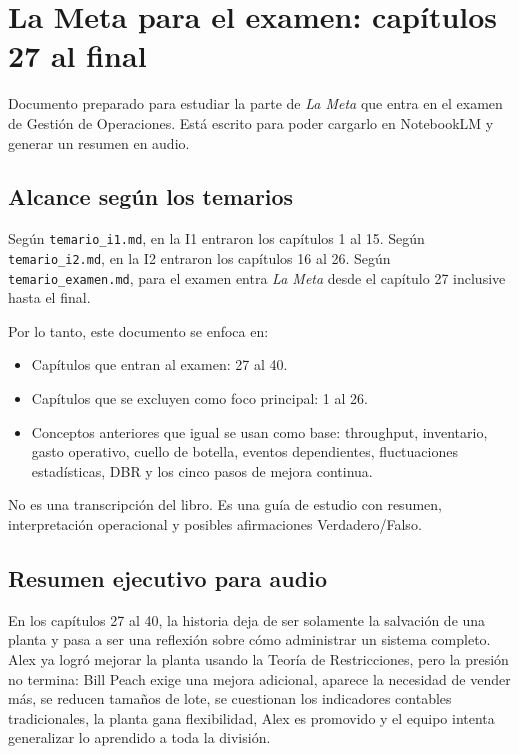 \documentclass[
  11pt,
]{article}
\author{}
\date{}
\providecommand{\tightlist}{%
  \setlength{\itemsep}{0pt}\setlength{\parskip}{0pt}}
\begin{document}
\hypertarget{la-meta-para-el-examen-capuxedtulos-27-al-final}{%
\section{La Meta para el examen: capítulos 27 al
final}\label{la-meta-para-el-examen-capuxedtulos-27-al-final}}

Documento preparado para estudiar la parte de \emph{La Meta} que entra
en el examen de Gestión de Operaciones. Está escrito para poder cargarlo
en NotebookLM y generar un resumen en audio.

\hypertarget{alcance-seguxfan-los-temarios}{%
\subsection{Alcance según los
temarios}\label{alcance-seguxfan-los-temarios}}

Según \texttt{temario\_i1.md}, en la I1 entraron los capítulos 1 al 15.
Según \texttt{temario\_i2.md}, en la I2 entraron los capítulos 16 al 26.
Según \texttt{temario\_examen.md}, para el examen entra \emph{La Meta}
desde el capítulo 27 inclusive hasta el final.

Por lo tanto, este documento se enfoca en:

\begin{itemize}
\tightlist
\item
  Capítulos que entran al examen: 27 al 40.
\item
  Capítulos que se excluyen como foco principal: 1 al 26.
\item
  Conceptos anteriores que igual se usan como base: throughput,
  inventario, gasto operativo, cuello de botella, eventos dependientes,
  fluctuaciones estadísticas, DBR y los cinco pasos de mejora continua.
\end{itemize}

No es una transcripción del libro. Es una guía de estudio con resumen,
interpretación operacional y posibles afirmaciones Verdadero/Falso.

\hypertarget{resumen-ejecutivo-para-audio}{%
\subsection{Resumen ejecutivo para
audio}\label{resumen-ejecutivo-para-audio}}

En los capítulos 27 al 40, la historia deja de ser solamente la
salvación de una planta y pasa a ser una reflexión sobre cómo
administrar un sistema completo. Alex ya logró mejorar la planta usando
la Teoría de Restricciones, pero la presión no termina: Bill Peach exige
una mejora adicional, aparece la necesidad de vender más, se reducen
tamaños de lote, se cuestionan los indicadores contables tradicionales,
la planta gana flexibilidad, Alex es promovido y el equipo intenta
generalizar lo aprendido a toda la división.
\end{document}

